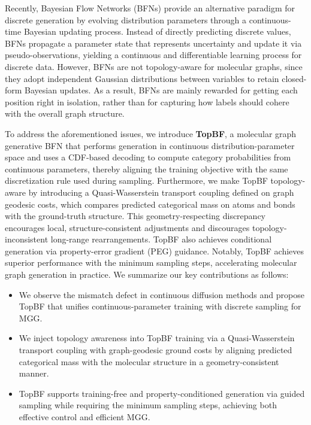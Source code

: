 \documentclass[journal,twoside,web]{ieeecolor}
\begin{document}
Recently, Bayesian Flow Networks (BFNs) \cite{graves2023bayesian,song2024unified} provide an alternative paradigm for discrete generation by evolving distribution parameters through a continuous-time Bayesian updating process. Instead of directly predicting discrete values, BFNs propagate a parameter state that represents uncertainty and update it via pseudo-observations, yielding a continuous and differentiable learning process for discrete data. 
However, BFNs are not topology-aware for molecular graphs, since they adopt independent Gaussian distributions between variables to retain closed-form Bayesian updates. As a result, BFNs are mainly rewarded for getting each position right in isolation, rather than for capturing how labels should cohere with the overall graph structure.

To address the aforementioned issues, we introduce \textbf{TopBF}, a molecular graph generative BFN that performs generation in continuous distribution-parameter space and uses a CDF-based decoding to compute category probabilities from continuous parameters, thereby aligning the training objective with the same discretization rule used during sampling. Furthermore, we make TopBF topology-aware by introducing a Quasi-Wasserstein transport coupling defined on graph geodesic costs, which compares predicted categorical mass on atoms and bonds with the ground-truth structure. This geometry-respecting discrepancy encourages local, structure-consistent adjustments and discourages topology-inconsistent long-range rearrangements. TopBF also achieves conditional generation via property-error gradient (PEG) guidance.
Notably, TopBF achieves superior performance with the minimum sampling steps, accelerating molecular graph generation in practice.
We summarize our key contributions as follows:

\begin{itemize}
    \item We observe the mismatch defect in continuous diffusion methods and propose TopBF that unifies continuous-parameter training with discrete sampling for MGG.
    \item We inject topology awareness into TopBF training via a Quasi-Wasserstein transport coupling with graph-geodesic ground costs by aligning predicted categorical mass with the molecular structure in a geometry-consistent manner.
    \item TopBF supports training-free and property-conditioned generation via guided sampling while requiring the minimum sampling steps, achieving both effective control and efficient MGG.
\end{itemize}
\end{document}
